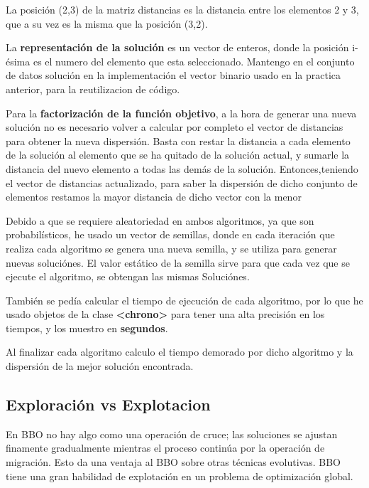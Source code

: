 \documentclass{article}
\begin{document}
\vspace{5mm}

La posición (2,3) de la matriz distancias es la distancia entre los elementos 2 y 3,
que a su vez es la misma que la posición (3,2).

\vspace{5mm}

La \textbf{representación de la solución} es un vector de enteros, donde la posición i-ésima
es el numero del elemento que esta seleccionado.
Mantengo en el conjunto de datos solución en la implementación el vector binario usado en la
practica anterior, para la reutilizacion de código.

\vspace{5mm}

Para la \textbf{factorización de la función objetivo}, a la hora de generar una nueva solución no
es necesario volver a calcular por completo el vector de distancias para obtener la nueva
dispersión. Basta con restar la distancia a cada elemento de la solución al elemento que
se ha quitado de la solución actual, y sumarle la distancia del nuevo elemento a todas las demás
de la solución.
\newline Entonces,teniendo el vector de distancias actualizado, para saber la dispersión de dicho conjunto
de elementos restamos la mayor distancia de dicho vector con la menor

\vspace{5mm}

Debido a que se requiere aleatoriedad en ambos algoritmos, ya que son probabilísticos, he usado un vector de semillas,
donde en cada iteración que
realiza cada algoritmo se genera una nueva semilla, y se utiliza para generar nuevas soluciónes.
El valor estático de la semilla sirve para que cada vez que se ejecute el algoritmo, se obtengan las mismas Soluciónes.

También se pedía calcular el tiempo de ejecución de cada algoritmo, por lo que he usado objetos de la clase
\textbf{<chrono>} para tener una alta precisión en los tiempos, y los muestro en \textbf{segundos}.

\vspace{5mm}

Al finalizar cada algoritmo calculo el tiempo demorado por dicho algoritmo y la dispersión de la
mejor solución encontrada.

\vspace{5mm}


\subsection{\normalsize Exploración vs Explotacion}
En BBO no hay algo como una operación de cruce; las soluciones se ajustan
finamente gradualmente mientras el proceso continúa por la operación de
migración. Esto da una ventaja al BBO sobre otras técnicas evolutivas. 
BBO tiene una gran habilidad de explotación en un
problema de optimización global. 
\end{document}
